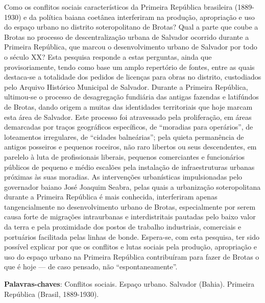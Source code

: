 
\setlength{\absparsep}{18pt} %
\begin{resumo}
Como os conflitos sociais característicos da Primeira República brasileira (1889-1930) e da política baiana coetânea interferiram na produção, apropriação e uso do espaço urbano no distrito soteropolitano de Brotas? Qual a parte que coube a Brotas no processo de descentralização urbana de Salvador ocorrido durante a Primeira República, que marcou o desenvolvimento urbano de Salvador por todo o século XX? Esta pesquisa responde a estas perguntas, ainda que provisoriamente, tendo como base um amplo repertório de fontes, entre as quais destaca-se a totalidade dos pedidos de licenças para obras no distrito, custodiados pelo Arquivo Histórico Municipal de Salvador. Durante a Primeira República, ultimou-se o processo de desagregação fundiária das antigas fazendas e latifúndos de Brotas, dando origem a muitas das identidades territoriais que hoje marcam esta área de Salvador. Este processo foi atravessado pela proliferação, em áreas demarcadas por traços geográficos específicos, de “moradias para operários”, de loteamentos irregulares, de “cidades balneárias”; pela quieta permanência de antigos posseiros e pequenos roceiros, não raro libertos ou seus descendentes, em parelelo à luta de profissionais liberais, pequenos comerciantes e funcionários públicos de pequeno e médio escalões pela instalação de infraestruturas urbanas próximas às suas moradias. As intervenções urbanísticas impulsionadas pelo governador baiano José Joaquim Seabra, pelas quais a urbanização soteropolitana durante a Primeira República é mais conhecida, interferiram apenas tangencialmente no desenvolvimento urbano de Brotas, especialmente por serem causa forte de migrações intraurbanas e interdistritais pautadas pelo baixo valor da terra e pela proximidade dos postos de trabalho industriais, comerciais e portuários facilitada pelas linhas de bonde. Espera-se, com esta pesquisa, ter sido possível explicar por que os conflitos e lutas sociais pela produção, apropriação e uso do espaço urbano na Primeira República contribuíram para fazer de Brotas o que é hoje — de caso pensado, não “espontaneamente”. 

\vspace{\onelineskip}
 
   \noindent 

 \textbf{Palavras-chaves}: Conflitos sociais. Espaço urbano. Salvador (Bahia). Primeira República (Brasil, 1889-1930).
\end{resumo}

